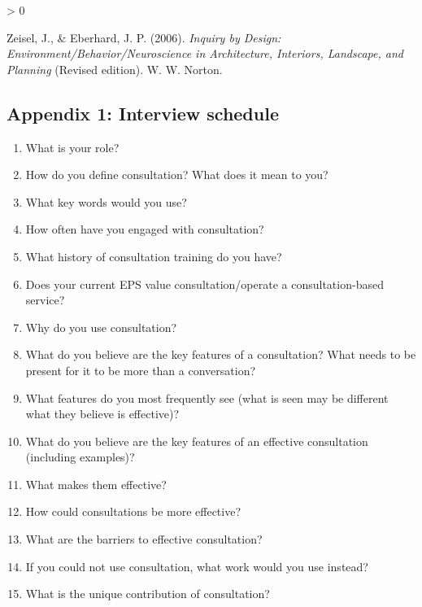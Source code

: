 \documentclass[
  english,
  man,floatsintext]{apa6}
\providecommand{\tightlist}{%
  \setlength{\itemsep}{0pt}\setlength{\parskip}{0pt}}
\newlength{\cslhangindent}
\newenvironment{CSLReferences}[2] %
 {%
  \setlength{\parindent}{0pt}
  \ifodd #1 \everypar{\setlength{\hangindent}{\cslhangindent}}\ignorespaces\fi
  \ifnum #2 > 0
  \setlength{\parskip}{#2\baselineskip}
  \fi
 }%
 {}
\begin{document}
\begin{CSLReferences}{1}{0}
\leavevmode\hypertarget{ref-zeiselInquiryDesignEnvironment2006}{}%
Zeisel, J., \& Eberhard, J. P. (2006). \emph{Inquiry by {Design}: {Environment}/{Behavior}/{Neuroscience} in {Architecture}, {Interiors}, {Landscape}, and {Planning}} (Revised edition). {W. W. Norton}.

\end{CSLReferences}

\endgroup

\newpage

\hypertarget{appendix-1-interview-schedule}{%
\subsection{Appendix 1: Interview schedule}\label{appendix-1-interview-schedule}}

\begin{enumerate}
\def\labelenumi{\arabic{enumi})}
\tightlist
\item
  What is your role?
\item
  How do you define consultation? What does it mean to you?
\item
  What key words would you use?
\item
  How often have you engaged with consultation?
\item
  What history of consultation training do you have?
\item
  Does your current EPS value consultation/operate a
  consultation-based service?
\item
  Why do you use consultation?
\item
  What do you believe are the key features of a consultation? What
  needs to be present for it to be more than a conversation?
\item
  What features do you most frequently see (what is seen may be
  different what they believe is effective)?
\item
  What do you believe are the key features of an effective
  consultation (including examples)?
\item
  What makes them effective?
\item
  How could consultations be more effective?
\item
  What are the barriers to effective consultation?
\item
  If you could not use consultation, what work would you use instead?
\item
  What is the unique contribution of consultation?
\end{enumerate}
\end{document}
